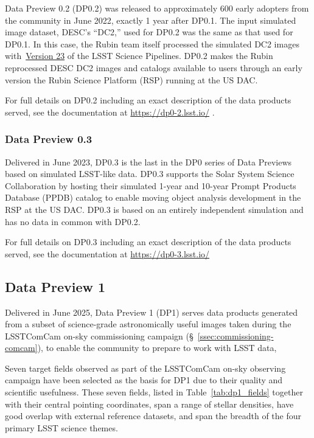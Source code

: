Data Preview 0.2 (DP0.2) was released to approximately 600 early adopters from the community in June 2022, exactly 1 year after DP0.1.
The input simulated image dataset, DESC's ``DC2,'' used for DP0.2 was the same as that used for DP0.1.
In this case, the Rubin team itself processed the simulated DC2 images with~\href{https://pipelines.lsst.io/v/v23_0_0/index.html}{Version 23} of the LSST Science Pipelines.
DP0.2 makes the Rubin reprocessed DESC DC2 images and catalogs available to users through an early version the Rubin Science Platform (RSP) running at the US DAC.

For full details on DP0.2 including an exact description of the data products served, see the documentation at \url{https://dp0-2.lsst.io/} .

\subsubsection{Data Preview 0.3}
\label{sec:dp03}

Delivered in June  2023, DP0.3 is the last in the DP0 series of Data Previews based on simulated LSST-like data.
DP0.3 supports the Solar System Science Collaboration by hosting their simulated 1-year and 10-year Prompt Products Database (PPDB) catalog to enable moving object analysis development in the RSP at the US DAC.
DP0.3 is based on an entirely independent simulation and has no data in common with DP0.2.

For full details on DP0.3 including an exact description of the data products served, see the documentation at \url{https://dp0-3.lsst.io/}

\subsection{Data Preview 1}
\label{ssec:dp1}

Delivered in June 2025, Data Preview 1 (DP1) serves data products generated from a subset of science-grade astronomically useful images  taken  during  the LSSTComCam on-sky commissioning campaign (\S~\ref{ssec:commissioning-comcam}), to enable the community to prepare to work with LSST data, \citep[][]{10.71929/rubin/2570308}

Seven target fields observed as part of the LSSTComCam on-sky observing campaign  have been selected as the basis for DP1 due to their quality and scientific usefulness.
These seven fields, listed in Table~\ref{tab:dp1_fields} together with their central pointing coordinates, span a range of stellar densities, have good overlap with external reference datasets, and span the breadth of the four primary LSST science themes.


